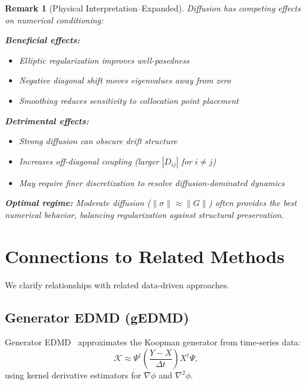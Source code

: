 \documentclass[11pt,a4paper]{article}
\newtheorem{remark}[theorem]{Remark}
\newcommand{\Koop}{\mathcal{K}}
\begin{document}
\begin{remark}[Physical Interpretation--Expanded]
Diffusion has competing effects on numerical conditioning:

\textbf{Beneficial effects:}
\begin{itemize}
\item Elliptic regularization improves well-posedness
\item Negative diagonal shift moves eigenvalues away from zero
\item Smoothing reduces sensitivity to collocation point placement
\end{itemize}

\textbf{Detrimental effects:}
\begin{itemize}
\item Strong diffusion can obscure drift structure
\item Increases off-diagonal coupling (larger $|D_{ij}|$ for $i \neq j$)
\item May require finer discretization to resolve diffusion-dominated dynamics
\end{itemize}

\textbf{Optimal regime:} Moderate diffusion ($\|\sigma\| \approx \|G\|$) often provides the best numerical behavior, balancing regularization against structural preservation.
\end{remark}

\section{Connections to Related Methods}\label{sec:connections}

We clarify relationships with related data-driven approaches.

\subsection{Generator EDMD (gEDMD)}

Generator EDMD~\cite{Klus2020} approximates the Koopman generator from time-series data:
\begin{equation}
\Koop \approx \Psi^\dagger \left(\frac{Y - X}{\Delta t}\right) X^\dagger \Psi,
\end{equation}
using kernel derivative estimators for $\nabla \phi$ and $\nabla^2 \phi$.
\end{document}
